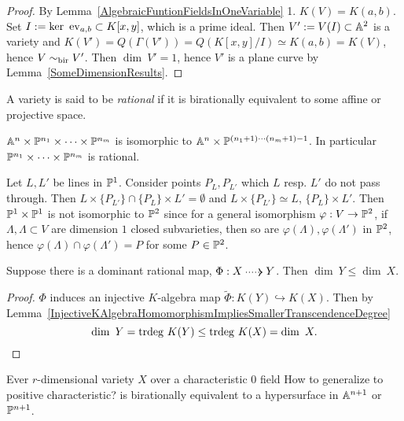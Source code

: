     \begin{proof}
        By Lemma~\ref{AlgebraicFuntionFieldsInOneVariable} 1. $K(V)=K(a,b)$. Set $I:= \ker \ \mathrm{ev}_{a,b}\subset K[x,y]$, which is a prime ideal. Then $V':= V(I)\subset \mathbb{A}^2$ is a variety and $K(V')= Q(\Gamma(V'))= Q(K[x,y]/I)\simeq K(a,b)=K(V)$, hence $V\sim_{\mathrm{bir}} V'$. Then $\dim \ V' = 1$, hence $V'$ is a plane curve by Lemma~\ref{SomeDimensionResults}.
    \end{proof}
    \begin{definition}
        A variety is said to be \textit{rational} if it is birationally equivalent to some affine or projective space. 
    \end{definition}
    \begin{example}
        $\mathbb{A}^n\times\mathbb{P}^{n_1}\times \cdots \times \mathbb{P}^{n_m}$ is isomorphic to $\mathbb{A}^n \times \mathbb{P}^{(n_1+1)\cdots (n_m+1)-1}$. In particular $\mathbb{P}^{n_1}\times \cdots \times \mathbb{P}^{n_m}$ is rational.
    \end{example}
    \begin{example}
        Let $L,L'$ be lines in $\mathbb{P}^1$. Consider points $P_L,P_{L'}$ which $L$ resp. $L'$ do not pass through. Then $L\times \{P_{L'}\}\cap \{P_L\}\times L'=\emptyset$ and $L\times \{P_{L'}\}\simeq L$, $\{P_L\}\times L'$. Then $\mathbb{P}^1\times \mathbb{P}^1$ is not isomorphic to $\mathbb{P}^2$ since for a general isomorphism $\varphi: V\rightarrow \mathbb{P}^2$, if $\Lambda,\Lambda\subset V$ are dimension $1$ closed subvarieties, then so are $\varphi(\Lambda),\varphi(\Lambda')$ in $\mathbb{P}^2$, hence $\varphi(\Lambda)\cap \varphi(\Lambda')=P$ for some $P\in \mathbb{P}^2$.
    \end{example}
    \begin{proposition}
        Suppose there is a dominant rational map, $\Phi: X\dottedarrow Y$. Then $\dim\ Y \leq \dim \ X$.
    \end{proposition}
    \begin{proof}
        $\Phi$ induces an injective $K$-algebra map $\widetilde{\Phi}: K(Y)\hookrightarrow K(X)$. Then by Lemma~\ref{InjectiveKAlgebraHomomorphismImpliesSmallerTranscendenceDegree} 
        $$\dim \ Y = \mathrm{trdeg }\ K(Y)\leq \mathrm{trdeg }\ K(X) = \dim \ X.$$
    \end{proof}
    \begin{proposition}
        Ever $r$-dimensional variety $X$ over a characteristic $0$ field {\Large How to generalize to positive characteristic?} is birationally equivalent to a hypersurface in $\mathbb{A}^{n+1}$ or $\mathbb{P}^{n+1}$.
    \end{proposition}
